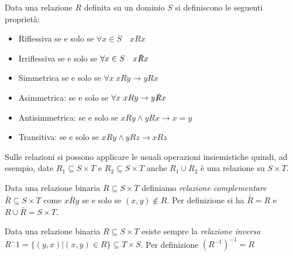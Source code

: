 Data una relazione $R$ definita su un dominio $S$ si definiscono le seguenti proprietà:
\begin{itemize}
  \item Riflessiva se e solo se $\forall x \in S \quad xRx$
  \item Irriflessiva se e solo se $\forall x \in S \quad x \slashed{R} x$
  \item Simmetrica se e solo se $\forall x \ xRy \rightarrow yRx$
  \item Asimmetrica: se e solo se $\forall x \ xRy \rightarrow y \slashed{R} x$
  \item Antisimmetrica: se e solo se $xRy \land yRx \rightarrow x = y$
  \item Transitiva: se e solo se $xRy \land yRz \rightarrow xRz$
\end{itemize}

Sulle relazioni si possono applicare le usuali operazioni insiemistiche quindi, ad esempio,
date $R_1 \subseteq S \times T$ e $R_2 \subseteq S \times T$ anche $R_1 \cup R_2$ è una relazione su $S \times T$.

Data una relazione binaria $R \subseteq S \times T$ definiamo \emph{relazione complementare}
$\bar{R} \subseteq S \times T$ come $x \bar{R} y$ se e solo se $(x,y) \not \in R$.
Per definizione si ha $\bar{\bar{R}} = R$ e $R \cup \bar{R} = S \times T$.

Data una relazione binaria $R \subseteq S \times T$ esiste sempre la \emph{relazione inversa}
$R^-1 = \{(y,x) | (x,y) \in R\} \subseteq T \times S$.
Per definizione $(R ^ {-1}) ^ {-1} = R$
